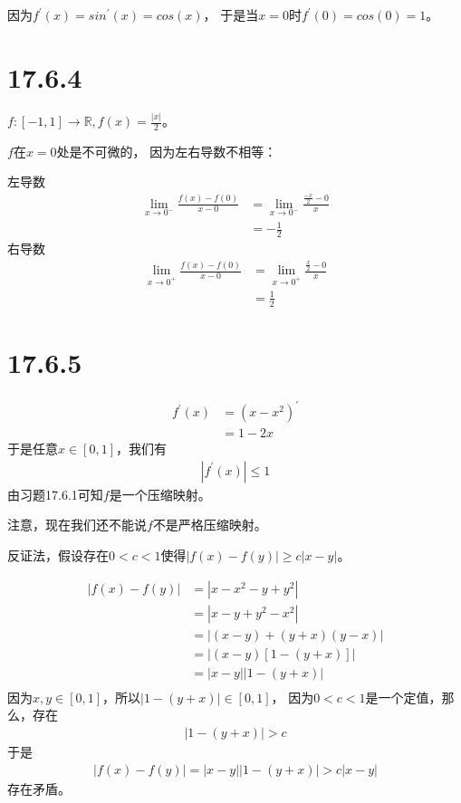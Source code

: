 \documentclass{article}
\begin{document}
因为$f^\prime(x) = sin^\prime(x) = cos(x)$，
于是当$x = 0$时$f^\prime(0) = cos(0) = 1$。

\section*{17.6.4}

$f: [-1, 1] \to \mathbb{R}, f(x) = \frac{|x|}{2}$。

$f$在$x = 0$处是不可微的，
因为左右导数不相等：

左导数
\begin{align*}
  \lim\limits_{x \to 0^-} \frac{f(x) - f(0)}{x - 0}
   & = \lim\limits_{x \to 0^-} \frac{\frac{-x}{2} - 0}{x} \\
   & = -\frac{1}{2}
\end{align*}
右导数
\begin{align*}
  \lim\limits_{x \to 0^+} \frac{f(x) - f(0)}{x - 0}
   & = \lim\limits_{x \to 0^+} \frac{\frac{x}{2} - 0}{x} \\
   & = \frac{1}{2}
\end{align*}

\section*{17.6.5}

\begin{align*}
  f^\prime(x) & = (x - x^2)^\prime \\
              & = 1 - 2x
\end{align*}
于是任意$x \in [0, 1]$，我们有
\begin{align*}
  |f^\prime(x)| \leq 1
\end{align*}
由习题17.6.1可知$f$是一个压缩映射。

注意，现在我们还不能说$f$不是严格压缩映射。

反证法，假设存在$0 < c < 1$使得$|f(x) - f(y)| \geq c|x - y|$。

\begin{align*}
  |f(x) - f(y)|
   & = |x - x^2 - y + y^2|        \\
   & = |x - y + y^2 - x^2|        \\
   & = |(x - y) + (y + x)(y - x)| \\
   & = |(x - y)[1 - (y + x)]|     \\
   & = |x - y| |1 - (y + x)|      \\
\end{align*}
因为$x, y \in [0, 1]$，所以$|1 - (y + x)| \in [0, 1]$，
因为$0 < c < 1$是一个定值，那么，存在
\begin{align*}
  |1 - (y + x)| > c
\end{align*}
于是
\begin{align*}
  |f(x) - f(y)| = |x - y| |1 - (y + x)| > c |x - y|
\end{align*}
存在矛盾。
\end{document}
